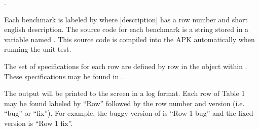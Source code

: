 \documentclass{acmart} %
\begin{document}
.  

Each benchmark is labeled by  where [description] has a row number and short english description.
The source code for each benchmark is a string stored in a variable named .
This source code is compiled into the APK automatically when running the unit test.

The set of \newls specifications for each row are defined by row in the  object within .  These specifications may be found in .

The output will be printed to the screen in a log format.  Each row of Table 1 may be found labeled by ``Row'' followed by the row number and version (i.e. ``bug'' or ``fix'').  For example, the buggy version of \apGa is ``Row 1 bug'' and the fixed version is ``Row 1 fix''.  

\newcommand{\cTimeout}{\showclock{0}{45}}
\newsavebox{\cSafeBox}
\newcommand{\cSafe}{
\usebox{\cSafeBox}
}

\newsavebox{\cSafeToFiveBox}
\newcommand{\cSafeToFive}{
\usebox{\cSafeToFiveBox}
}

\newsavebox{\cAlarmBox}
\newcommand{\cAlarm}{\usebox{\cAlarmBox}}
%
\end{document}
